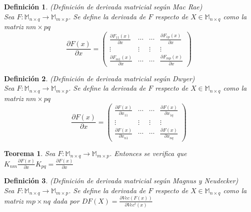 \documentclass{article}
\theoremstyle{theorem-style}  %
\newtheorem{theorem}{Teorema}[section]  %
\theoremstyle{definition-style}
\newtheorem{definition}{Definición}[section]
\theoremstyle{example-style}
\theoremstyle{exercise-style}
\begin{document}
	\begin{definition}
		(Definición de derivada matricial según Mac Rae)\\
		Sea $F:\mathbb{M}_{n\times q}\rightarrow \mathbb{M}_{m\times p}$. Se define la derivada de $F$ respecto de $X\in \mathbb{M}_{n\times q}$ como la matriz $nm\times pq$
		$$ \frac{\partial F(x)}{\partial x} = \left( \begin{array}{cccc}
		\frac{\partial F_{11}(x)}{\partial x} & \cdots & \cdots & \frac{\partial F_{1p}(x)}{\partial x}\\
		\vdots & \vdots & \vdots & \vdots \\
		\frac{\partial F_{m1}(x)}{\partial x} & \cdots & \cdots & \frac{\partial F_{mp}(x)}{\partial x}
		\end{array}\right)$$	
	\end{definition}
	
	\begin{definition}
		(Definición de derivada matricial según Dwyer)\\
		Sea $F:\mathbb{M}_{n\times q}\rightarrow \mathbb{M}_{m\times p}$. Se define la derivada de $F$ respecto de $X\in \mathbb{M}_{n\times q}$ como la matriz $nm\times pq$
		$$ \frac{\partial F(x)}{\partial x} = \left( \begin{array}{cccc}
		\frac{\partial F(x)}{\partial x_{11}} & \cdots & \cdots & \frac{\partial F(x)}{\partial x_{1q}}\\
		\vdots & \vdots & \vdots & \vdots \\
		\frac{\partial F(x)}{\partial x_{n1}} & \cdots & \cdots & \frac{\partial F(x)}{\partial x_{nq}}
		\end{array}\right)$$	
	\end{definition}
	
	\begin{theorem}
		\textit{Sea $F:\mathbb{M}_{n\times q}\rightarrow \mathbb{M}_{m\times p}$. Entonces se verifica que $K_{nm}\frac{\partial F(x)}{\partial x}K_{pq}= \frac{\partial F(x)}{\partial x}$}
	\end{theorem}
	
	\begin{definition}
		(Definición de derivada matricial según Magnus y Neudecker)\\
		Sea $F:\mathbb{M}_{n\times q}\rightarrow \mathbb{M}_{m\times p}$. Se define la derivada de $F$ respecto de $X\in \mathbb{M}_{n\times q}$ como la matriz $mp\times nq$ dada por \textbf{$DF(X)=\frac{\partial Vec(F(x))}{\partial Vec^t(x)}$}
	\end{definition}
	
\end{document}
